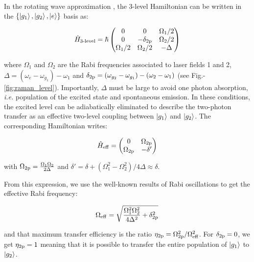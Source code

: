In the rotating wave approximation \cite{shore1996theory}, the 3-level Hamiltonian can be written in the $\{\ket{g_1},\ket{g_2},\ket{e} \}$ basis as:

\begin{equation}
    \hat{H}_{\text{3-level}} = \hbar \begin{pmatrix}
    0 & 0 & \Omega_1/2 \\
    0 & -\delta_{\rm{2p}} & \Omega_2/2 \\
    \Omega_1/2 & \Omega_2/2 & - \Delta \\
    \end{pmatrix}
\end{equation}

\noindent where $\Omega_1$ and $\Omega_2$ are the Rabi frequencies associated to laser fields 1 and 2, $\Delta = (\omega_{e}-\omega_{g_1})-\omega_1$ and $\delta_{\rm{2p}}=(\omega_{g_2} - \omega_{g_1}) - (\omega_2-\omega_1)$ (see Fig.-\ref{fig:raman_level}). Importantly, $\Delta$ must be large to avoid one photon absorption, {\it i.e.} population of the excited state and spontaneous emission. In these conditions, the excited level can be adiabatically eliminated to describe the two-photon transfer as an effective two-level coupling between $\ket{g_1}$ and $\ket{g_2}$. The corresponding Hamiltonian writes:

\begin{equation}
    \hat{H}_{\rm{eff}} = \begin{pmatrix}
    0 & \Omega_{\rm{2p}} \\
    \Omega_{\rm{2p}} & -\delta' \\
    \end{pmatrix}
\end{equation}

\noindent with $\Omega_{\rm{2p}}=\frac{\Omega_1 \Omega_2}{2 \Delta}$ and $\delta'=\delta + (\Omega_1^2-\Omega_2^2)/4\Delta \approx \delta$.

\noindent From this expression, we use the well-known results of Rabi oscillations \cite{cohen1986mecanique} to get the effective Rabi frequency:

\begin{equation}
    \Omega_{\rm{eff}}= \sqrt{\frac{\Omega_1^2 \Omega_2^2}{4 \Delta^2} + \delta_{\rm{2p}}^2}
\end{equation}

\noindent and that maximum transfer efficiency is the ratio $\eta_{\rm{2p}}=\Omega_{\rm{2p}}^2 /\Omega^2_{\rm{eff}}$. For $\delta_{\rm{2p}}=0$, we get $\eta_{\rm{2p}}=1$ meaning that it is possible to transfer the entire population of $\ket{g_1}$ to $\ket{g_2}$.




